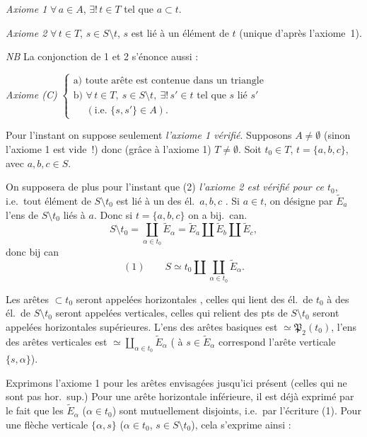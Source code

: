 \documentclass[11pt,a4paper]{article}
\begin{document}
\emph{Axiome 1} $\forall\, a\in A$, $\exists!\, t\in T$ tel que $a\subset t$.

\emph{Axiome 2} $\forall\, t\in T$, \struck{\ill{}} $s\in S\setminus t$, $s$ est lié à un élément de $t$ (unique d'après l'axiome~1).

\emph{NB} La conjonction de 1 et 2 s'énonce aussi :

\emph{Axiome (C)} $\left\{\begin{array}{l}\text{a) toute arête est contenue dans un triangle}\\ \text{b) } \forall\, t\in T,\ s\in S\setminus t,\ \exists!\, s'\in t \text{ tel que } s \text{ lié } s'\\ \phantom{\text{b) }}(\text{i.e.\ } \{s,s'\}\in A).\end{array}\right.$

Pour l'instant on suppose seulement  \emph{l'axiome 1 vérifié}. Supposons $A\neq\emptyset$ (sinon l'axiome 1 est vide~!) donc (grâce à l'axiome 1) $T\neq\emptyset$. Soit $t_0\in T$,  $t=\{a,b,c\}$, avec $a,b,c\in S$.

On supposera de plus pour l'instant que (2) \emph{l'axiome 2 est vérifié pour ce $t_0$}, i.e.\ tout élément de $S\setminus t_0$ est lié à un des él.\ $a,b,c$ . Si $a\in t$, on désigne par $\widetilde{E}_a$ l'ens de $S\setminus t_0$ liés à $a$. Donc si $t=\{a,b,c\}$ on a bij.\ can.
\[
  S\setminus t_0=\coprod_{\alpha\in t_0}\widetilde{E}_{\alpha}=\widetilde{E}_a\amalg\widetilde{E}_b\amalg\widetilde{E}_c ,
\]
donc bij can
\[
  (1)\qquad S\simeq t_0\amalg\coprod_{\alpha\in t_0}\widetilde{E}_{\alpha}.
\]

Les arêtes $\subset t_0$ seront appelées horizontales , celles qui lient des él.\ de $t_0$ à des él.\ de $S\setminus t_0$ seront appelées verticales, celles qui relient des pts de $S\setminus t_0$ seront appelées horizontales supérieures.  L'ens des arêtes basiques  est $\simeq\mathfrak{P}_2(t_0)$, l'ens des arêtes verticales est $\simeq\coprod_{\alpha\in t_0}\widetilde{E}_{\alpha}$ ( à $s\in\widetilde{E}_{\alpha}$ correspond l'arête verticale $\{s,\alpha\}$).

Exprimons l'axiome 1 pour les arêtes envisagées jusqu'ici présent (celles qui ne sont pas hor.\ sup.) Pour une arête horizontale inférieure, il est déjà exprimé par le fait que les $\widetilde{E}_{\alpha}$ ($\alpha\in t_0$) sont mutuellement disjoints, i.e.\ par l'écriture (1). Pour une flèche verticale $\{\alpha,s\}$ ($\alpha\in t_0$, $s\in S\setminus t_0$), cela s'exprime ainsi :
\end{document}
